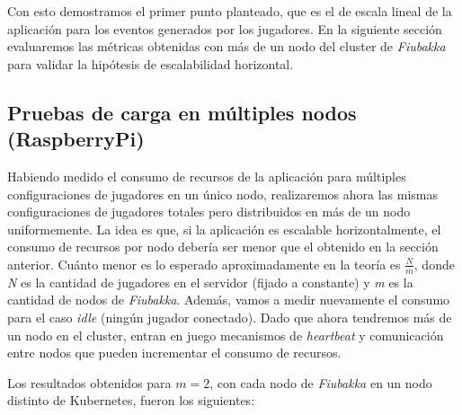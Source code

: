 Con esto demostramos el primer punto planteado, que es el de escala lineal de la aplicación para los eventos generados por los jugadores. En la siguiente sección evaluaremos las métricas obtenidas
con más de un nodo del cluster de \textit{Fiubakka} para validar la hipótesis de escalabilidad horizontal.

\subsection{Pruebas de carga en múltiples nodos (RaspberryPi)}

\noindent Habiendo medido el consumo de recursos de la aplicación para múltiples configuraciones de jugadores en un único nodo, realizaremos ahora las mismas configuraciones de jugadores totales
pero distribuidos en más de un nodo uniformemente. La idea es que, si la aplicación es escalable horizontalmente, el consumo de recursos por nodo debería ser menor que el obtenido en la sección anterior.
Cuánto menor es lo esperado aproximadamente en la teoría es $\frac{N}{m}$, donde \textit{N} es la cantidad de jugadores en el servidor (fijado a constante) y \textit{m} es la cantidad de nodos de \textit{Fiubakka}.
Además, vamos a medir nuevamente el consumo para el caso \textit{idle} (ningún jugador conectado). Dado que ahora tendremos más de un nodo en el cluster, entran en juego mecanismos de \textit{heartbeat} y comunicación
entre nodos que pueden incrementar el consumo de recursos.

Los resultados obtenidos para $m=2$, con cada nodo de \textit{Fiubakka} en un nodo distinto de Kubernetes, fueron los siguientes:

